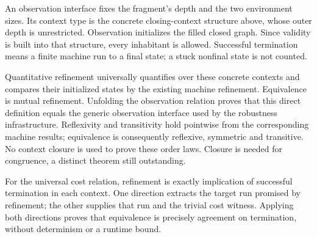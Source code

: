 







An observation interface fixes the fragment's depth and the two environment
sizes. Its context type is the concrete closing-context structure above,
whose outer depth is unrestricted. Observation initializes the filled closed
graph. Since validity is built into that structure, every inhabitant is
allowed. Successful termination means a finite machine run to a final state;
a stuck nonfinal state is not counted.

Quantitative refinement universally quantifies over these concrete contexts
and compares their initialized states by the existing machine refinement.
Equivalence is mutual refinement. Unfolding the observation relation proves
that this direct definition equals the generic observation interface used
by the robustness infrastructure. Reflexivity and transitivity hold pointwise
from the corresponding machine results; equivalence is consequently reflexive,
symmetric and transitive. No context closure is used to prove these order
laws. Closure is needed for congruence, a distinct theorem still outstanding.

For the universal cost relation, refinement is exactly implication of
successful termination in each context. One direction extracts the target
run promised by refinement; the other supplies that run and the trivial
cost witness. Applying both directions proves that equivalence is precisely
agreement on termination, without determinism or a runtime bound.
















